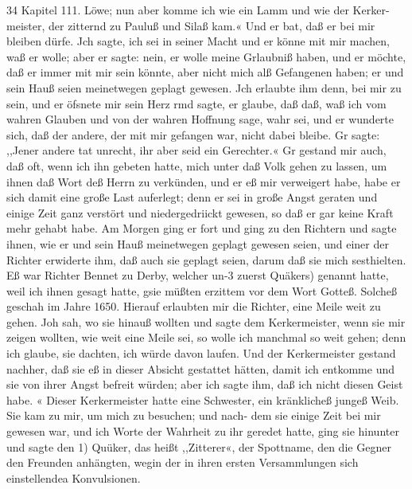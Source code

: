 34 Kapitel 111.
Löwe; nun aber komme ich wie ein Lamm und wie der Kerker-
meister, der zitternd zu Pauluß und Silaß kam.« Und er bat,
daß er bei mir bleiben dürfe. Jch sagte, ich sei in seiner Macht
und er könne mit mir machen, waß er wolle; aber er sagte:
nein, er wolle meine Grlaubniß haben, und er möchte, daß er
immer mit mir sein könnte, aber nicht mich alß Gefangenen haben;
er und sein Hauß seien meinetwegen geplagt gewesen. Jch erlaubte
ihm denn, bei mir zu sein, und er öfsnete mir sein Herz rmd
sagte, er glaube, daß daß, waß ich vom wahren Glauben und
von der wahren Hoffnung sage, wahr sei, und er wunderte sich,
daß der andere, der mit mir gefangen war, nicht dabei bleibe.
Gr sagte: ,,Jener andere tat unrecht, ihr aber seid ein Gerechter.«
Gr gestand mir auch, daß oft, wenn ich ihn gebeten hatte, mich
unter daß Volk gehen zu lassen, um ihnen daß Wort deß Herrn
zu verkünden, und er eß mir verweigert habe, habe er sich damit
eine große Last auferlegt; denn er sei in große Angst geraten
und einige Zeit ganz verstört und niedergedriickt gewesen, so daß
er gar keine Kraft mehr gehabt habe. Am Morgen ging er fort
und ging zu den Richtern und sagte ihnen, wie er und sein Hauß
meinetwegen geplagt gewesen seien, und einer der Richter erwiderte
ihm, daß auch sie geplagt seien, darum daß sie mich sesthielten.
Eß war Richter Bennet zu Derby, welcher un-3 zuerst Quäkers)
genannt hatte, weil ich ihnen gesagt hatte, gsie müßten erzittem
vor dem Wort Gotteß. Solcheß geschah im Jahre 1650.
Hierauf erlaubten mir die Richter, eine Meile weit zu gehen.
Joh sah, wo sie hinauß wollten und sagte dem Kerkermeister,
wenn sie mir zeigen wollten, wie weit eine Meile sei, so wolle
ich manchmal so weit gehen; denn ich glaube, sie dachten, ich
würde davon laufen. Und der Kerkermeister gestand nachher,
daß sie eß in dieser Absicht gestattet hätten, damit ich entkomme
und sie von ihrer Angst befreit würden; aber ich sagte ihm, daß
ich nicht diesen Geist habe. «
Dieser Kerkermeister hatte eine Schwester, ein kränklicheß
jungeß Weib. Sie kam zu mir, um mich zu besuchen; und nach-
dem sie einige Zeit bei mir gewesen war, und ich Worte der
Wahrheit zu ihr geredet hatte, ging sie hinunter und sagte den
1) Quüker, das heißt ,,Zitterer«, der Spottname, den die Gegner den
Freunden anhängten, wegin der in ihren ersten Versammlungen sich einstellendea
Konvulsionen.


